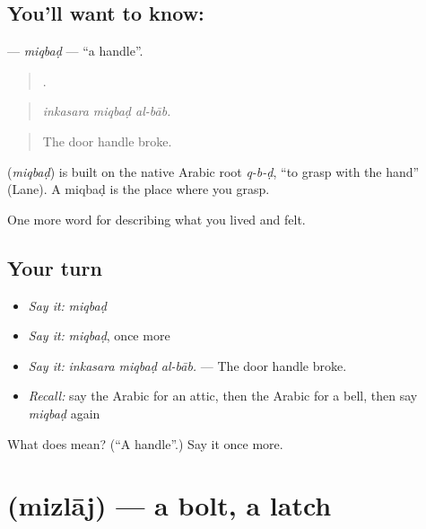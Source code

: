 \subsection*{You'll want to know: }
\textbf{} — \emph{miqbaḍ} — \textquotedblleft{}a handle\textquotedblright{}.

\begin{quote}
  .
\end{quote}

\begin{quote}
\emph{inkasara miqbaḍ al-bāb.}
\end{quote}

\begin{quote}
The door handle broke.
\end{quote}

\begin{cousinweb}
\textbf{} (\emph{miqbaḍ}) is built on the native Arabic root \emph{q-b-ḍ}, \textquotedblleft{}to grasp with the hand\textquotedblright{} (Lane). A miqbaḍ is the place where you grasp.
\end{cousinweb}

\begin{grammarlens}[title={What you've built}]
One more word for describing what you lived and felt.
\end{grammarlens}

\subsection*{Your turn}
\begin{itemize}
\raggedright
  \item \emph{Say it:} \emph{miqbaḍ}
  \item \emph{Say it:} \emph{miqbaḍ}, once more
  \item \emph{Say it:} \emph{inkasara miqbaḍ al-bāb.} — The door handle broke.
  \item \emph{Recall:} say the Arabic for an attic, then the Arabic for a bell, then say \emph{miqbaḍ} again
\end{itemize}

\begin{tcolorbox}[breakable,colback=teal!4,colframe=teal!35!black,title={Before you move on}]
What does  mean? (\textquotedblleft{}A handle\textquotedblright{}.) Say it once more.
\end{tcolorbox}
\section[\texorpdfstring{\ar{مزلاج} (mizlāj)}{مزلاج (mizlāj)}]{ (mizlāj) — a bolt, a latch}

